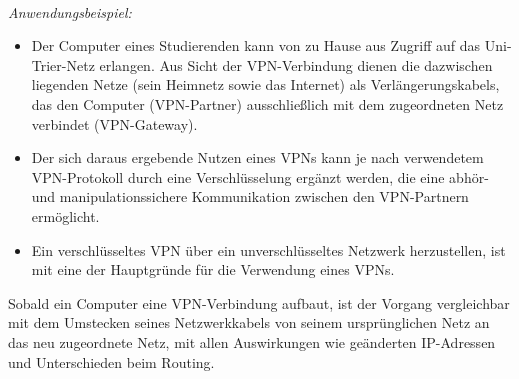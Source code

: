 ~\\
\textit{Anwendungsbeispiel:}
\begin{itemize}
	\item Der Computer eines Studierenden kann von zu Hause aus Zugriff auf das Uni-Trier-Netz erlangen. Aus Sicht der VPN-Verbindung dienen die dazwischen liegenden Netze (sein Heimnetz sowie das Internet) als Verlängerungskabels, das den Computer (VPN-Partner) ausschließlich mit dem zugeordneten Netz verbindet (VPN-Gateway). 
\item Der sich daraus ergebende Nutzen eines VPNs kann je nach verwendetem VPN-Protokoll durch eine Verschlüsselung ergänzt werden, die eine abhör- und manipulationssichere Kommunikation zwischen den VPN-Partnern ermöglicht.
\item Ein verschlüsseltes VPN über ein unverschlüsseltes Netzwerk herzustellen, ist mit eine der Hauptgründe für die Verwendung eines VPNs.
\end{itemize}
Sobald ein Computer eine VPN-Verbindung aufbaut, ist der Vorgang vergleichbar mit dem Umstecken seines Netzwerkkabels von seinem ursprünglichen Netz an das neu zugeordnete Netz, mit allen Auswirkungen wie geänderten IP-Adressen und Unterschieden beim Routing. 


